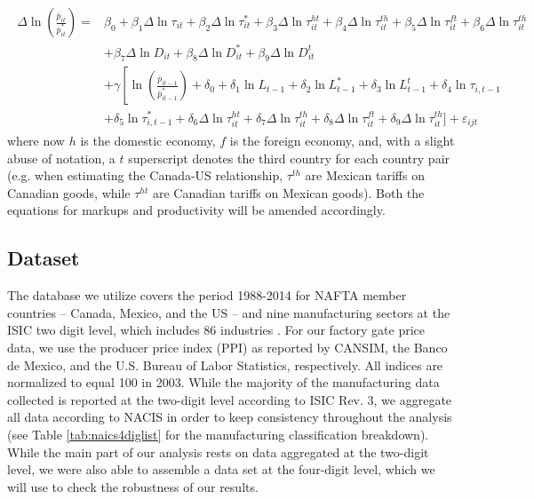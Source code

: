 \begin{align}
\begin{split}\label{eq:gw-estimation-prices-third-country}
\Delta \ln \left( \frac{\bar{p}_{it}}{\bar{p}_{it}^*} \right) = 
&\beta_0 + \beta_1 \Delta \ln \tau_{it} + \beta_2 \Delta \ln \tau_{it}^* + \beta_3 \Delta \ln \tau_{it}^{ht} 
+ \beta_4 \Delta \ln \tau_{it}^{th} + \beta_5 \Delta \ln \tau_{it}^{ft} + \beta_6 \Delta \ln \tau_{it}^{th} \\ 
&+ \beta_7 \Delta \ln D_{it} + \beta_8 \Delta \ln D_{it}^* + \beta_9 \Delta \ln D_{it}^t \\ 
&+ \gamma \left[ \ln \left( \frac{\bar{p}_{it-1}}{\bar{p}_{it-1}^*} \right) + \delta_0 + \delta_1 \ln L_{t-1} + \delta_2\ln L_{t-1}^* 
 + \delta_3 \ln L_{t-1}^t+ \delta_4 \ln \tau_{i,t-1} \right. \\ 
&+ \left. \delta_5 \ln  \tau_{i,t-1}^*  + \delta_6 \Delta \ln \tau_{it}^{ht} + \delta_7 \Delta \ln \tau_{it}^{th} 
 + \delta_8 \Delta \ln \tau_{it}^{ft} + \delta_9 \Delta \ln \tau_{it}^{th} \bigg] \right. + \varepsilon_{ijt} 
\end{split}\end{align}
where now $h$ is the domestic economy, $f$ is the foreign economy, and, with a slight abuse of notation, a $t$ superscript denotes the third country for each country pair (e.g. when estimating the Canada-US relationship, $\tau^{th}$ are Mexican tariffs on Canadian goods, while $\tau^{ht}$ are Canadian tariffs on Mexican goods). Both the equations for markups and productivity will be amended accordingly. 

\subsection{Dataset}

The database we utilize covers the period 1988-2014 for NAFTA member countries -- Canada, Mexico, and the US -- and nine manufacturing sectors at the ISIC two digit level, which includes 86 industries . For our factory gate price data, we use the producer price index (PPI) as reported by CANSIM, the Banco de Mexico, and the U.S. Bureau of Labor Statistics, respectively. All indices are normalized to equal 100 in 2003. While the majority of the manufacturing data collected is reported at the two-digit level according to ISIC Rev. 3, we aggregate all data according to NACIS in order to keep consistency throughout the analysis (see Table \ref{tab:naics4diglist} for the manufacturing classification breakdown). While the main part of our analysis rests on data aggregated at the two-digit level, we were also able to assemble a data set at the four-digit level, which we will use to check the robustness of our results. 

